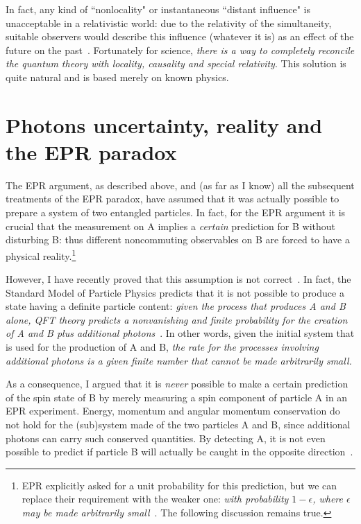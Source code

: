 \documentclass[12pt]{article}
\begin{document}
In fact, any kind of ``nonlocality" or instantaneous ``distant
influence" is unacceptable in a relativistic world: due to the
relativity of the simultaneity, suitable observers would describe this
influence (whatever it is) as an effect of the future on the
past~\cite{BaJa87}. Fortunately for science, \emph{there is a way to
completely reconcile the quantum theory with locality, causality and
special relativity}. This solution is quite natural and is based
merely on known physics.


\section{Photons uncertainty, reality and the EPR paradox} 

The EPR argument, as described above, and (as far as I know) all the
subsequent treatments of the EPR paradox, have assumed that it was
actually possible to prepare a system of two entangled particles.  In
fact, for the EPR argument it is crucial that the measurement on A
implies a \emph{certain} prediction for B without disturbing B: thus
different noncommuting observables on B are forced to have a physical
reality.\footnote{EPR explicitly asked for a unit probability for this
prediction, but we can replace their requirement with the weaker one:
\emph{with probability $1-\epsilon$, where $\epsilon$ may be made
arbitrarily small}~\cite{Ballentine70}. The following discussion
remains true.}

However, I have recently proved that this assumption is not
correct~\cite{pureprp}. In fact, the Standard Model of Particle
Physics predicts that it is not possible to produce a state having a
definite particle content: \emph{given the process that produces A and
B alone, QFT theory predicts a nonvanishing and finite probability for
the creation of A and B plus additional photons}~\cite{pureprp}. In
other words, given the initial system that is used for the production
of A and B, \emph{the rate for the processes involving additional
photons is a given finite number that cannot be made arbitrarily
small.}

As a consequence, I argued that it is \emph{never} possible to make
a certain prediction of the spin state of B by merely measuring a
spin component of particle A in an EPR experiment. Energy,
momentum and angular momentum conservation do not hold for the
(sub)system made of the two particles A and B, since additional
photons can carry such conserved quantities. By detecting A, it is
not even possible to predict if particle B will actually be caught
in the opposite direction~\cite{pureprp}.
\end{document}
